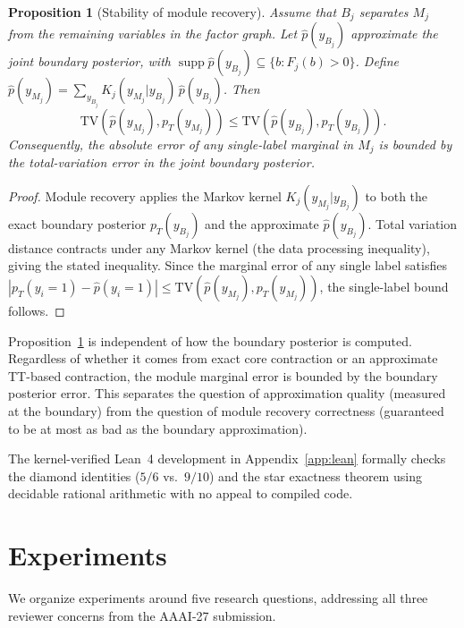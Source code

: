 \documentclass[12pt]{article}
\newtheorem{proposition}{Proposition}[section]
\newcommand{\suppref}[1]{Appendix~\ref{#1}}
\begin{document}
\begin{proposition}[Stability of module recovery]
\label{prop:boundary-error}
Assume that $B_j$ separates $M_j$ from the remaining variables in the
factor graph. Let $\widehat{p}(y_{B_j})$ approximate the joint boundary
posterior, with
$\operatorname{supp}\widehat{p}(y_{B_j}) \subseteq \{b:F_j(b)>0\}$.
Define $\widehat{p}(y_{M_j}) = \sum_{y_{B_j}}K_j(y_{M_j}|y_{B_j})\,\widehat{p}(y_{B_j})$.
Then
\[
  \mathrm{TV}\!\left(\widehat{p}(y_{M_j}),p_T(y_{M_j})\right)
  \le
  \mathrm{TV}\!\left(\widehat{p}(y_{B_j}),p_T(y_{B_j})\right).
\]
Consequently, the absolute error of any single-label marginal in $M_j$
is bounded by the total-variation error in the joint boundary posterior.
\end{proposition}

\begin{proof}
Module recovery applies the Markov kernel
$K_j(y_{M_j}|y_{B_j})$ to both the exact boundary posterior
$p_T(y_{B_j})$ and the approximate $\widehat{p}(y_{B_j})$. Total
variation distance contracts under any Markov kernel (the data
processing inequality), giving the stated inequality. Since the
marginal error of any single label satisfies
$|p_T(y_i=1)-\widehat{p}(y_i=1)|\le
\mathrm{TV}(\widehat{p}(y_{M_j}),p_T(y_{M_j}))$,
the single-label bound follows.
\end{proof}

Proposition~\ref{prop:boundary-error} is independent of how the
boundary posterior is computed. Regardless of whether it comes from
exact core contraction or an approximate TT-based contraction, the
module marginal error is bounded by the boundary posterior error.
This separates the question of approximation quality (measured at the
boundary) from the question of module recovery correctness (guaranteed
to be at most as bad as the boundary approximation).

The kernel-verified Lean~4 development in \suppref{app:lean} formally
checks the diamond identities ($5/6$ vs.\ $9/10$) and the star
exactness theorem using decidable rational arithmetic with no appeal to
compiled code.

\section{Experiments}
\label{sec:experiments}

We organize experiments around five research questions, addressing all
three reviewer concerns from the AAAI-27 submission.
\end{document}
